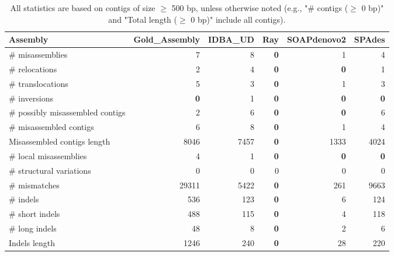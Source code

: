 \documentclass[12pt,a4paper]{article}
\begin{document}
\begin{table}[ht]
\begin{center}
\caption{All statistics are based on contigs of size $\geq$ 500 bp, unless otherwise noted (e.g., "\# contigs ($\geq$ 0 bp)" and "Total length ($\geq$ 0 bp)" include all contigs).}
\begin{tabular}{|l*{5}{|r}|}
\hline
Assembly & Gold\_Assembly & IDBA\_UD & Ray & SOAPdenovo2 & SPAdes \\ \hline
\# misassemblies & 7 & 8 & {\bf 0} & 1 & 4 \\ \hline
\hspace{5mm}\# relocations & 2 & 4 & {\bf 0} & {\bf 0} & 1 \\ \hline
\hspace{5mm}\# translocations & 5 & 3 & {\bf 0} & 1 & 3 \\ \hline
\hspace{5mm}\# inversions & {\bf 0} & 1 & {\bf 0} & {\bf 0} & {\bf 0} \\ \hline
\# possibly misassembled contigs & 2 & 6 & {\bf 0} & {\bf 0} & 6 \\ \hline
\# misassembled contigs & 6 & 8 & {\bf 0} & 1 & 4 \\ \hline
Misassembled contigs length & 8046 & 7457 & {\bf 0} & 1333 & 4024 \\ \hline
\# local misassemblies & 4 & 1 & {\bf 0} & {\bf 0} & {\bf 0} \\ \hline
\# structural variations & 0 & 0 & 0 & 0 & 0 \\ \hline
\# mismatches & 29311 & 5422 & {\bf 0} & 261 & 9663 \\ \hline
\# indels & 536 & 123 & {\bf 0} & 6 & 124 \\ \hline
\hspace{5mm}\# short indels & 488 & 115 & {\bf 0} & 4 & 118 \\ \hline
\hspace{5mm}\# long indels & 48 & 8 & {\bf 0} & 2 & 6 \\ \hline
Indels length & 1246 & 240 & {\bf 0} & 28 & 220 \\ \hline
\end{tabular}
\end{center}
\end{table}
\end{document}
